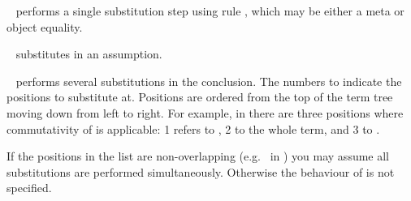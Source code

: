 \begin{isabellebody}
\begin{isamarkuptext}
\begin{description}
  \item \hyperlink{method.subst}{\mbox{}}~ performs a single substitution step
  using rule , which may be either a meta or object
  equality.

  \item \hyperlink{method.subst}{\mbox{}}~ substitutes in an
  assumption.

  \item \hyperlink{method.subst}{\mbox{}}~ performs several
  substitutions in the conclusion. The numbers  to 
  indicate the positions to substitute at.  Positions are ordered from
  the top of the term tree moving down from left to right. For
  example, in  there are three positions
  where commutativity of  is applicable: 1 refers to , 2 to the whole term, and 3 to .

  If the positions in the list  are non-overlapping
  (e.g.\  in ) you may
  assume all substitutions are performed simultaneously.  Otherwise
  the behaviour of  is not specified.


\end{description}
\end{isamarkuptext}
\end{isabellebody}
